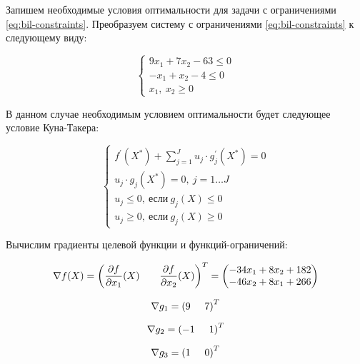 Запишем необходимые условия оптимальности для задачи с ограничениями \ref{eq:bil-constraints}. Преобразуем систему с ограничениями \ref{eq:bil-constraints} к следующему виду:

\begin{equation*}
	\begin{cases}
		9 x_1 + 7 x_2 - 63 \leq 0
		\\
		-x_1 + x_2 - 4 \leq 0
		\\
		x_1,\ x_2 \geq 0
	\end{cases}
\end{equation*}

В данном случае необходимым условием оптимальности будет следующее условие Куна-Такера:

\begin{equation}
\label{eq:kt}
	\begin{cases}
		f^{'}(X^*) + \sum\limits_{j = 1}^J u_j \cdot g^{'}_j(X^*) = 0
		\\
		u_j \cdot g_j(X^*) = 0,\ j = 1 \dots J
		\\
		u_j \leq 0,\ \text{если}\ g_j(X) \leq 0
		\\
		u_j \geq 0,\ \text{если}\ g_j(X) \geq 0
	\end{cases}
\end{equation}

Вычислим градиенты целевой функции и функций-ограничений:

\begin{equation*}
	\nabla f(X) = \left(  \frac{\partial f}{\partial x_1}(X) \hspace{7mm} \frac{\partial f}{\partial x_2}(X) \right)^T = \begin{pmatrix}
		-34 x_1 + 8 x_2 + 182
		\\
		-46 x_2 + 8 x_1 + 266
	\end{pmatrix}
\end{equation*}

\begin{equation*}
	\nabla g_1 = \left( 9 \hspace{5mm} 7 \right)^T
\end{equation*}

\begin{equation*}
	\nabla g_2 = \left( -1 \hspace{5mm} 1 \right)^T
\end{equation*}

\begin{equation*}
	\nabla g_3 = \left( 1 \hspace{5mm} 0 \right)^T
\end{equation*}

